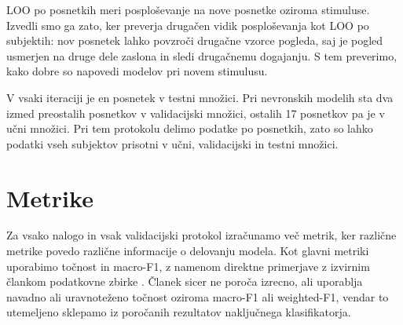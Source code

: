 LOO po posnetkih meri posploševanje na nove posnetke oziroma stimuluse.
Izvedli smo ga zato, ker preverja drugačen vidik posploševanja kot LOO po subjektih: nov posnetek lahko povzroči drugačne vzorce pogleda, saj je pogled usmerjen na druge dele zaslona in sledi drugačnemu dogajanju.
S tem preverimo, kako dobre so napovedi modelov pri novem stimulusu.

V vsaki iteraciji je en posnetek v testni množici.
Pri nevronskih modelih sta dva izmed preostalih posnetkov v validacijski množici, ostalih 17 posnetkov pa je v učni množici.
Pri tem protokolu delimo podatke po posnetkih, zato so lahko podatki vseh subjektov prisotni v učni, validacijski in testni množici.

\section{Metrike}
\label{subsec:metrike}

Za vsako nalogo in vsak validacijski protokol izračunamo več metrik, ker različne metrike povedo različne informacije o delovanju modela.
Kot glavni metriki uporabimo točnost in macro-F1, z namenom direktne primerjave z izvirnim člankom podatkovne zbirke \MAHNOB{}.
Članek sicer ne poroča izrecno, ali uporablja navadno ali uravnoteženo točnost oziroma macro-F1 ali weighted-F1, vendar to utemeljeno sklepamo iz poročanih rezultatov naključnega klasifikatorja.

